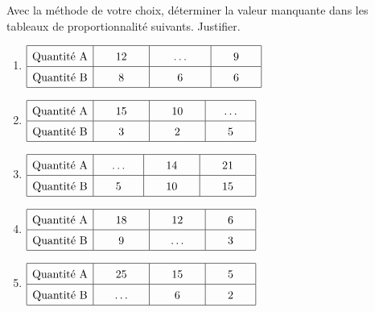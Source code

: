 \documentclass[11pt]{article}
\begin{document}
\begin{exercicedevoir}
Avec la méthode de votre choix, déterminer la valeur manquante dans les tableaux de
proportionnalité suivants. Justifier.
\begin{multicols}{2}
\begin{enumerate}
\item 
$\renewcommand{\arraystretch}{1.5}
\begin{array}{|c|c|c|c|} \hline
\text{Quantité A} & \phantom{000}12\phantom{000} & \phantom{000}\ldots\phantom{000} & \phantom{000}9\phantom{000} \\
\hline
\text{Quantité B} & 8 & 6 & 6 \\ 
\hline
\end{array}$

\item 
$\renewcommand{\arraystretch}{1.5}
\begin{array}{|c|c|c|c|}
\hline
\text{Quantité A} & \phantom{000}15\phantom{000} & \phantom{000}10\phantom{000} & \ldots \\ 
\hline
\text{Quantité B} & 3 & 2 & \phantom{000}5\phantom{000} \\ 
\hline
\end{array}$

\item 
$\renewcommand{\arraystretch}{1.5}
\begin{array}{|c|c|c|c|}
\hline
\text{Quantité A} & \ldots & 14 & 21 \\ 
\hline
\text{Quantité B} & \phantom{000}5\phantom{000} & \phantom{000}10\phantom{000} & \phantom{000}15\phantom{000} \\ 
\hline
\end{array}$

\item 
$\renewcommand{\arraystretch}{1.5}
\begin{array}{|c|c|c|c|}
\hline
\text{Quantité A} & \phantom{000}18\phantom{000} & \phantom{000}12\phantom{000} & \phantom{000}6\phantom{000} \\ 
\hline
\text{Quantité B} & 9 & \ldots & 3 \\ 
\hline
\end{array}$

\item 
$\renewcommand{\arraystretch}{1.5}
\begin{array}{|c|c|c|c|}
\hline
\text{Quantité A} & \phantom{000}25\phantom{000} & \phantom{000}15\phantom{000} & \phantom{000}5\phantom{000} \\ 
\hline
\text{Quantité B} & \ldots & 6 & 2 \\ 
\hline
\end{array}$


\end{enumerate}
\end{multicols}
\end{exercicedevoir}
\end{document}

